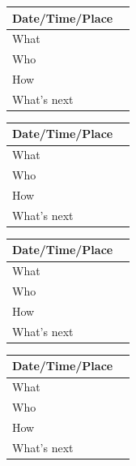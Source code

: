 \documentclass{article}
\begin{document}
\begin{table}[H]
\begin{tabular}{|p{1.5in}|p{4in}|}
\hline
Date/Time/Place &  \\ \hline
What            &  \\ \hline
Who             &  \\ \hline
How             &  \\ \hline
What's next     &  \\ \hline
\end{tabular}
\end{table}

\begin{table}[H]
\begin{tabular}{|p{1.5in}|p{4in}|}
\hline
Date/Time/Place &  \\ \hline
What            &  \\ \hline
Who             &  \\ \hline
How             &  \\ \hline
What's next     &  \\ \hline
\end{tabular}
\end{table}

\begin{table}[H]
\begin{tabular}{|p{1.5in}|p{4in}|}
\hline
Date/Time/Place &  \\ \hline
What            &  \\ \hline
Who             &  \\ \hline
How             &  \\ \hline
What's next     &  \\ \hline
\end{tabular}
\end{table}

\begin{table}[H]
\begin{tabular}{|p{1.5in}|p{4in}|}
\hline
Date/Time/Place &  \\ \hline
What            &  \\ \hline
Who             &  \\ \hline
How             &  \\ \hline
What's next     &  \\ \hline
\end{tabular}
\end{table}
\end{document}
